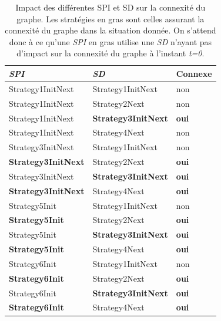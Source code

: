 \documentclass[a4paper]{article}
\begin{document}
\begin{minipage}{0.5\textwidth}
    \begin{table}[H]
\centering
    \begin{tabular}{| l | l | l |}
  \hline
  \textsl{SPI} & \textsl{SD} & \textbf{Connexe}\\
  \hline
  Strategy1InitNext & Strategy1InitNext & non\\
  \hline
  Strategy1InitNext & Strategy2Next &  non\\
  \hline
  Strategy1InitNext & \textbf{Strategy3InitNext} & \textbf{oui}\\
  \hline
  Strategy1InitNext & Strategy4Next & non \\
  \hline
  Strategy3InitNext & Strategy1InitNext & non \\
  \hline
  \textbf{Strategy3InitNext} & Strategy2Next & \textbf{oui} \\
  \hline
  Strategy3InitNext & \textbf{Strategy3InitNext} & \textbf{oui}\\
  \hline
  \textbf{Strategy3InitNext} & Strategy4Next & \textbf{oui}\\
  \hline
  Strategy5Init & Strategy1InitNext & non \\
  \hline
  \textbf{Strategy5Init} & Strategy2Next & \textbf{oui}\\
  \hline
  Strategy5Init & \textbf{Strategy3InitNext} & \textbf{oui} \\
  \hline
  \textbf{Strategy5Init} & Strategy4Next & \textbf{oui} \\
  \hline
  Strategy6Init & Strategy1InitNext & non\\
  \hline
  \textbf{Strategy6Init} & Strategy2Next & \textbf{oui} \\
  \hline
  Strategy6Init & \textbf{Strategy3InitNext} & \textbf{oui}\\
  \hline
  \textbf{Strategy6Init} & Strategy4Next & \textbf{oui}\\
  \hline
\end{tabular}
    \caption{Impact des différentes SPI et SD sur la connexité du
      graphe. Les stratégies en gras sont celles assurant la connexité
    du graphe dans la situation donnée. On s'attend donc à ce qu'une
    \textsl{SPI} en gras utilise une \textsl{SD} n'ayant pas d'impact
    sur la connexité du graphe à l'instant \textsl{t=0}.}
    \label{table:SPISDGraphe}
  \end{table}
\end{minipage}
\end{document}
